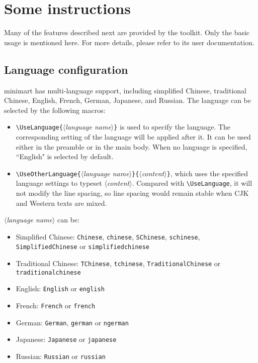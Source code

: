 \documentclass{minimart}
\providecommand{\meta}[1]{$\langle${\normalfont\itshape#1}$\rangle$}
\providecommand{\minimart}{\textsf{minimart}}
\begin{document}
\section{Some instructions}

Many of the features described next are provided by the \ProjLib{} toolkit. Only the basic usage is mentioned here. For more details, please refer to its user documentation.

\subsection{Language configuration}

\minimart{} has multi-language support, including simplified Chinese, traditional Chinese, English, French, German, Japanese, and Russian. The language can be selected by the following macros:

\begin{itemize}
    \item \lstinline|\UseLanguage{|\meta{language name}\lstinline|}| is used to specify the language. The corresponding setting of the language will be applied after it. It can be used either in the preamble or in the main body. When no language is specified, ``English" is selected by default.
    \item \lstinline|\UseOtherLanguage{|\meta{language name}\lstinline|}{|\meta{content}\lstinline|}|, which uses the specified language settings to typeset \meta{content}. Compared with \lstinline|\UseLanguage|, it will not modify the line spacing, so line spacing would remain stable when CJK and Western texts are mixed.
\end{itemize}

\meta{language name} can be:
\begin{itemize}
    \item Simplified Chinese: \texttt{Chinese}, \texttt{chinese}, \texttt{SChinese}, \texttt{schinese}, \texttt{SimplifiedChinese} or \texttt{simplifiedchinese}
    \item Traditional Chinese: \texttt{TChinese}, \texttt{tchinese}, \texttt{TraditionalChinese} or \texttt{traditionalchinese}
    \item English: \texttt{English} or \texttt{english}
    \item French: \texttt{French} or \texttt{french}
    \item German: \texttt{German}, \texttt{german} or \texttt{ngerman}
    \item Japanese: \texttt{Japanese} or \texttt{japanese}
    \item Russian: \texttt{Russian} or \texttt{russian}
\end{itemize}
\end{document}
